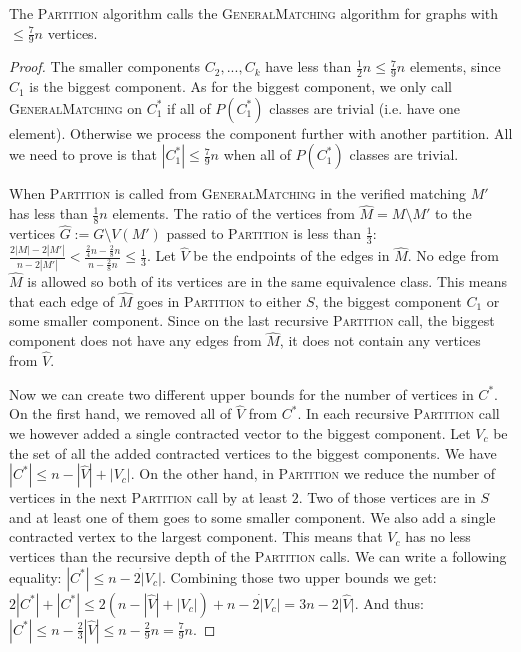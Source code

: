 \begin{lemma}
The \textsc{Partition} algorithm calls the \textsc{GeneralMatching} algorithm for graphs with $\le \frac{7}{9}n$ vertices.
\end{lemma}
\begin{proof}
The smaller components $C_2,...,C_k$ have less than $\frac{1}{2}n \le \frac{7}{9}n$ elements, since $C_1$ is the biggest component.
As for the biggest component, we only call \textsc{GeneralMatching} on $C^*_1$ if all of $P(C^*_1)$ classes are trivial (i.e. have one element).
Otherwise we process the component further with another partition.
All we need to prove is that $|C^*_1|\le\frac{7}{9}n$ when all of $P(C^*_1)$ classes are trivial.

When \textsc{Partition} is called from \textsc{GeneralMatching} in  the verified matching $M'$ has less than $\frac{1}{8}n$ elements.
The ratio of the vertices from $\hat M = M\setminus M'$ to the vertices $\hat G := G\setminus V(M')$ passed to \textsc{Partition} is less than $\frac{1}{3}$: $\frac{2|M|-2|M'|}{n-2|M'|} < \frac{\frac{2}{4}n - \frac{2}{8}n}{n-\frac{2}{8}n} \le \frac{1}{3}$.
Let $\hat V$ be the endpoints of the edges in $\hat M$.
No edge from $\hat M$ is allowed so both of its vertices are in the same equivalence class.
This means that each edge of $\hat M$ goes in \textsc{Partition} to either $S$, the biggest component $C_1$ or some smaller component.
Since on the last recursive \textsc{Partition} call, the biggest component does not have any edges from $\hat M$, it does not contain any vertices from $\hat V$.

Now we can create two different upper bounds for the number of vertices in $C^*$.
On the first hand, we removed all of $\hat V$ from $C^*$.
In each recursive \textsc{Partition} call we however added a single contracted vector to the biggest component.
Let $V_c$ be the set of all the added contracted vertices to the biggest components.
We have $|C^*| \le n-|\hat V|+|V_c|$.
On the other hand, in \textsc{Partition} we reduce the number of vertices in the next \textsc{Partition} call by at least $2$.
Two of those vertices are in $S$ and at least one of them goes to some smaller component.
We also add a single contracted vertex to the largest component.
This means that $V_c$ has no less vertices than the recursive depth of the \textsc{Partition} calls.
We can write a following equality: $|C^*| \le n-2\dot|V_c|$.
Combining those two upper bounds we get: $2|C^*|+|C^*| \le 2(n-|\hat V|+|V_c|)+n-2\dot|V_c|=3n-2|\hat V|$.
And thus: $|C^*| \le n-\frac{2}{3}|\hat V| \le n-\frac{2}{9}n = \frac{7}{9}n$.
\end{proof}

